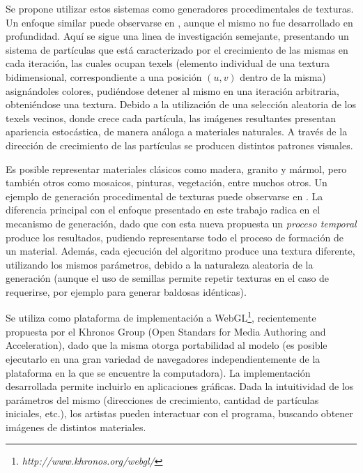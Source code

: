 Se propone utilizar estos sistemas como generadores procedimentales de texturas. Un enfoque similar puede observarse en \cite{Kranidotis98}, aunque el mismo no fue desarrollado en profundidad.
Aquí se sigue una linea de investigaci\'on semejante, presentando un sistema de part\'iculas que est\'a caracterizado por el crecimiento de las mismas en cada iteraci\'on, las cuales ocupan texels (elemento individual de una textura bidimensional, correspondiente a una posición $(u,v)$ dentro de la misma) asign\'andoles colores, pudi\'endose detener al mismo en una iteración arbitraria, obteni\'endose una textura.
Debido a la utilización de una selección aleatoria de los texels vecinos, donde crece cada partícula, las im\'agenes resultantes presentan apariencia estocástica, de manera análoga a materiales naturales.
A trav\'es de la direcci\'on de crecimiento de las part\'iculas se producen distintos patrones visuales.

Es posible representar materiales cl\'asicos como madera, granito y m\'armol, pero tambi\'en otros como mosaicos, pinturas, vegetaci\'on, entre muchos otros.
Un ejemplo de generación procedimental de texturas puede observarse en \cite{Baravalle2010}.
La diferencia principal con el enfoque presentado en este trabajo radica en el mecanismo de generaci\'on, dado que con esta nueva propuesta un {\em proceso temporal} produce los resultados, pudiendo representarse todo el proceso de formaci\'on de un material.
Adem\'as, cada ejecución del algoritmo produce una textura diferente, utilizando los mismos par\'ametros, debido a la naturaleza aleatoria de la generaci\'on (aunque el uso de semillas permite repetir texturas en el caso de requerirse, por ejemplo para generar baldosas id\'enticas).

Se utiliza como plataforma de implementaci\'on a WebGL\footnote{\em http://www.khronos.org/webgl/}, recientemente propuesta por el Khronos Group (Open Standars for Media Authoring and Acceleration), dado que la misma otorga portabilidad al modelo (es posible ejecutarlo en una gran variedad de navegadores independientemente de la plataforma en la que se encuentre la computadora). 
La implementación desarrollada permite incluirlo en aplicaciones gr\'aficas.
Dada la intuitividad de los parámetros del mismo (direcciones de crecimiento, cantidad de partículas iniciales, etc.), los artistas pueden interactuar con el programa, buscando obtener imágenes de distintos materiales.

